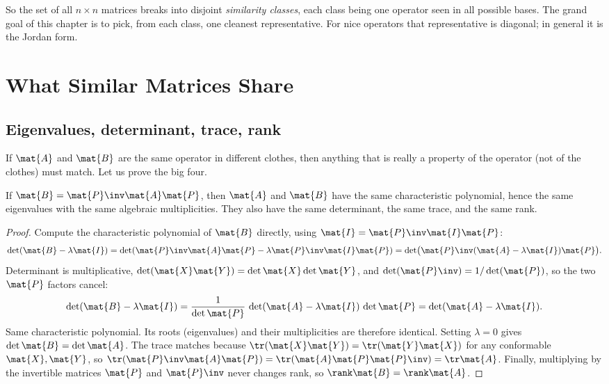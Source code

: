 So the set of all $n\times n$ matrices breaks into disjoint \emph{similarity classes},
each class being one operator seen in all possible bases. The grand goal of this chapter
is to pick, from each class, one cleanest representative. For nice operators that
representative is diagonal; in general it is the Jordan form.

\section{What Similar Matrices Share}
\label{ch28:invariants}

\subsection{Eigenvalues, determinant, trace, rank}

If $\mat{A}$ and $\mat{B}$ are the same operator in different clothes, then anything that
is really a property of the operator (not of the clothes) must match. Let us prove the
big four.

\begin{theorem}
\label{ch28:thm-invariants}
If $\mat{B}=\mat{P}\inv\mat{A}\mat{P}$, then $\mat{A}$ and $\mat{B}$ have the same
characteristic polynomial, hence the same eigenvalues with the same algebraic
multiplicities. They also have the same determinant, the same trace, and the same rank.
\end{theorem}

\begin{proof}
Compute the characteristic polynomial of $\mat{B}$ directly, using
$\mat{I}=\mat{P}\inv\mat{I}\mat{P}$:
\[
\det(\mat{B}-\lambda\mat{I})
= \det(\mat{P}\inv\mat{A}\mat{P}-\lambda\mat{P}\inv\mat{I}\mat{P})
= \det\!\big(\mat{P}\inv(\mat{A}-\lambda\mat{I})\mat{P}\big).
\]
Determinant is multiplicative, $\det(\mat{X}\mat{Y})=\det\mat{X}\det\mat{Y}$, and
$\det(\mat{P}\inv)=1/\det(\mat{P})$, so the two $\mat{P}$ factors cancel:
\[
\det(\mat{B}-\lambda\mat{I}) = \frac{1}{\det\mat{P}}\,\det(\mat{A}-\lambda\mat{I})\,\det\mat{P}
= \det(\mat{A}-\lambda\mat{I}).
\]
Same characteristic polynomial. Its roots (eigenvalues) and their multiplicities are
therefore identical. Setting $\lambda=0$ gives $\det\mat{B}=\det\mat{A}$. The trace
matches because $\tr(\mat{X}\mat{Y})=\tr(\mat{Y}\mat{X})$ for any conformable
$\mat{X},\mat{Y}$, so
$\tr(\mat{P}\inv\mat{A}\mat{P})=\tr(\mat{A}\mat{P}\mat{P}\inv)=\tr\mat{A}$. Finally,
multiplying by the invertible matrices $\mat{P}$ and $\mat{P}\inv$ never changes rank, so
$\rank\mat{B}=\rank\mat{A}$.
\end{proof}

